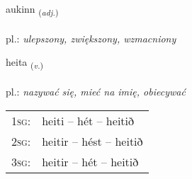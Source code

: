 \documentclass[frontgrid, backgrid]{flacards}\usepackage[]{graphicx}\usepackage[]{xcolor}
\begin{document}
\renewcommand{\flhead}{\vskip5pt \fboxsep=0pt {\small\bfseries\footnotesize Lýsingarorð | przymiotnik}}
\renewcommand{\fcfoot}{\vskip5pt \fboxsep=0pt \hspace{2pt}{\small\bfseries\footnotesize 1K}}

\renewcommand{\blhead}{\vskip5pt {\small\bfseries\footnotesize Lýsingarorð | przymiotnik }}
\renewcommand{\bcfoot}{\vskip5pt \hspace{2pt}{\small\bfseries\footnotesize 1K}}


{aukinn \small{\textsubscript{(\textit{adj.})}} \\[1ex] %
\textphonetic{[œiːcɪn]} \\
pl.: \emph{ulepszony, zwiększony, wzmacniony} \\  [2ex]
\renewcommand*{\arraystretch}{0.8}
}

\renewcommand{\flhead}{\vskip5pt \fboxsep=0pt {\small\bfseries\footnotesize Sagnorð | czasownik}}
\renewcommand{\fcfoot}{\vskip5pt \fboxsep=0pt \hspace{2pt}{\small\bfseries\footnotesize 1K}}

\renewcommand{\blhead}{\vskip5pt {\small\bfseries\footnotesize Sagnorð | czasownik }}
\renewcommand{\bcfoot}{\vskip5pt \hspace{2pt}{\small\bfseries\footnotesize 1K}}


{heita \small{\textsubscript{(\textit{v.})}} \\[1ex] %
\textphonetic{[heiːta]} \\
pl.: \emph{nazywać się, mieć na imię, obiecywać} \\  [2ex]
\renewcommand*{\arraystretch}{0.8}
\begin{tabular}{p{1cm}l}
\textsc{1sg}: & heiti -- hét -- heitið \\ 
\textsc{2sg}: & heitir -- hést -- heitið \\ 
\textsc{3sg}: & heitir -- hét -- heitið \\ 
\end{tabular}
}
\end{document}
